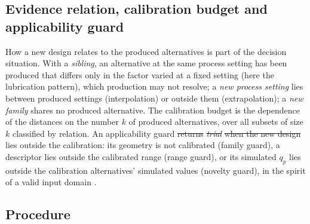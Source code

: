 \documentclass[pdflatex,sn-basic,lineno]{sn-jnl}
\providecommand{\DIFadd}[1]{{\protect\color{blue}\uwave{#1}}} %
\providecommand{\DIFdel}[1]{{\protect\color{red}\sout{#1}}}                      %
\providecommand{\DIFaddbegin}{} %
\providecommand{\DIFaddend}{} %
\providecommand{\DIFdelbegin}{} %
\providecommand{\DIFdelend}{} %
\newcommand{\DIFscaledelfig}{0.5}
\newlength{\DIFdelgraphicswidth} %
\newlength{\DIFdelgraphicsheight} %
\newcommand{\DIFaddincludegraphics}[2][]{{\color{blue}\fbox{\DIFOincludegraphics[#1]{#2}}}} %
\newcommand{\DIFdelincludegraphics}[2][]{%
\sbox{\DIFdelgraphicsbox}{\DIFOincludegraphics[#1]{#2}}%
\settoboxwidth{\DIFdelgraphicswidth}{\DIFdelgraphicsbox} %
\settoboxtotalheight{\DIFdelgraphicsheight}{\DIFdelgraphicsbox} %
\scalebox{\DIFscaledelfig}{%
\parbox[b]{\DIFdelgraphicswidth}{\usebox{\DIFdelgraphicsbox}\\[-\baselineskip] \rule{\DIFdelgraphicswidth}{0em}}\llap{\resizebox{\DIFdelgraphicswidth}{\DIFdelgraphicsheight}{%
\setlength{\unitlength}{\DIFdelgraphicswidth}%
\begin{picture}(1,1)%
\thicklines\linethickness{2pt} %
{\color[rgb]{1,0,0}\put(0,0){\framebox(1,1){}}}%
{\color[rgb]{1,0,0}\put(0,0){\line( 1,1){1}}}%
{\color[rgb]{1,0,0}\put(0,1){\line(1,-1){1}}}%
\end{picture}%
}\hspace*{3pt}}} %
} %
\DeclareRobustCommand{\DIFaddbegin}{\DIFOaddbegin \let\includegraphics\DIFaddincludegraphics} %
\DeclareRobustCommand{\DIFaddend}{\DIFOaddend \let\includegraphics\DIFOincludegraphics} %
\DeclareRobustCommand{\DIFdelbegin}{\DIFOdelbegin \let\includegraphics\DIFdelincludegraphics} %
\DeclareRobustCommand{\DIFdelend}{\DIFOaddend \let\includegraphics\DIFOincludegraphics} %
\begin{document}
\subsection{Evidence relation, calibration budget and applicability guard}\label{sec:budget}

How a new design relates to the produced alternatives is part of the decision situation. With a \emph{sibling}, an alternative at the same process setting has been produced that differs only in the factor varied at a fixed setting (here the lubrication pattern), which production may not resolve; a \emph{new process setting} lies between produced settings (interpolation) or outside them (extrapolation); a \emph{new family} shares no produced alternative. The calibration budget is the dependence of the distances on the number $k$ of produced alternatives, over all subsets of size $k$ classified by relation. An applicability guard \DIFdelbegin \DIFdel{returns }\emph{\DIFdel{trial}} %
\DIFdel{when the new design }\DIFdelend \DIFaddbegin \DIFadd{flags a new design that }\DIFaddend lies outside the calibration: its geometry is not calibrated (family guard), a descriptor lies outside the calibrated range (range guard), or its simulated $q_p$ lies outside the calibration alternatives' simulated values (novelty guard), in the spirit of a valid input domain \citep{malak2010using}.

\subsection{Procedure}\label{sec:procedure}
\end{document}
